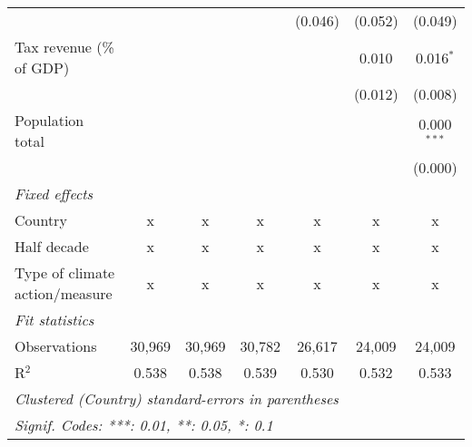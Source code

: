 \begin{tabular}{lcccccc}
                                                     &         &               &               & (0.046)       & (0.052)       & (0.049)\\   
   Tax revenue (\% of GDP)                           &         &               &               &               & 0.010         & 0.016$^{*}$\\   
                                                     &         &               &               &               & (0.012)       & (0.008)\\   
   Population total                                  &         &               &               &               &               & 0.000$^{***}$\\   
                                                     &         &               &               &               &               & (0.000)\\   
   \emph{Fixed effects}\\
   Country                                           & x       & x             & x             & x             & x             & x\\  
   Half decade                                       & x       & x             & x             & x             & x             & x\\  
   Type of climate action/measure                    & x       & x             & x             & x             & x             & x\\  
   \midrule \emph{Fit statistics}\\
   Observations                                      & 30,969  & 30,969        & 30,782        & 26,617        & 24,009        & 24,009\\  
   R$^2$                                             & 0.538   & 0.538         & 0.539         & 0.530         & 0.532         & 0.533\\  
   \midrule
   \multicolumn{7}{l}{\emph{Clustered (Country) standard-errors in parentheses}}\\
   \multicolumn{7}{l}{\emph{Signif. Codes: ***: 0.01, **: 0.05, *: 0.1}}\\
\end{tabular}
\par\endgroup


